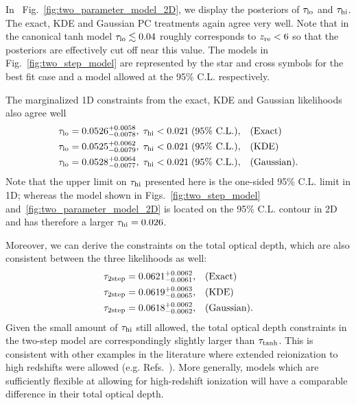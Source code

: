 \documentclass[prd,twocolumn,amsmath,amssymb,floatfix,superscriptaddress,nofootinbib]{revtex4-1}
\newcommand{\reffig}[1]{Fig.~\ref{fig:#1}}
\newcommand{\zre}{z_{\rm re}}
\newcommand{\tauhi}{\tau_{\rm hi}}
\newcommand{\taulo}{\tau_{\rm lo}}
\begin{document}
In ~\reffig{two_parameter_model_2D}, we display the posteriors of $\taulo$ and $\tauhi$. The exact, KDE and Gaussian PC treatments again agree very well. 
Note that in the canonical tanh model $\taulo \lesssim 0.04$ roughly corresponds to $\zre < 6$ so that the posteriors are effectively cut off  near this value.
The models in Fig.~\ref{fig:two_step_model} are represented by the star and cross symbols for the best fit case and a model allowed at the 95\% C.L. respectively.

The marginalized 1D constraints from the exact, KDE and Gaussian likelihoods also agree well
\begin{align}
\taulo = 0.0526^{+0.0058}_{-0.0078}, \; \tauhi < 0.021\; (95\% \text{ C.L.}), & \quad({\rm Exact}) \nonumber\\
\taulo = 0.0525^{+0.0062}_{-0.0079}, \; \tauhi < 0.021\;  (95\% \text{ C.L.}), & \quad({\rm KDE}) \nonumber\\
\taulo = 0.0528^{+0.0064}_{- 0.0077}, \; \tauhi < 0.021\; (95\% \text{ C.L.}), & \quad({\rm Gaussian}).
\end{align}
Note that the upper limit on $\tau_{\rm hi}$ presented here is the one-sided 95\% C.L. limit in 1D; whereas the model shown in Figs.~\ref{fig:two_step_model} and~\ref{fig:two_parameter_model_2D} is located on the 95\% C.L. contour in 2D and has therefore a larger $\tau_{\rm hi} = 0.026$.

Moreover, we can derive the constraints on the total optical depth, which are also consistent between the three likelihoods as well:
%
\begin{align}
\tau_{\rm 2step} = 0.0621^{+0.0062}_{-0.0061}, & \quad (\text{Exact)} \nonumber\\
\tau_{\rm 2step} = 0.0619^{+0.0063}_{-0.0065},  & \quad (\text{KDE)} \nonumber\\
\tau_{\rm 2step} = 0.0618^{+0.0062}_{-0.0062}, & \quad (\text{Gaussian).}
\end{align}
%
Given the small amount of $\tau_{\rm hi}$ still allowed, the total optical depth constraints in the two-step model are correspondingly slightly larger than $\tau_{\rm tanh}$.
This is consistent with other examples in the literature where extended reionization to high redshifts were allowed (e.g. Refs.~\cite{Ahn:2020btj, Paoletti:2020ndu}). More generally,
models which are sufficiently flexible at allowing for high-redshift ionization will have a comparable difference in their total optical depth.
\end{document}
